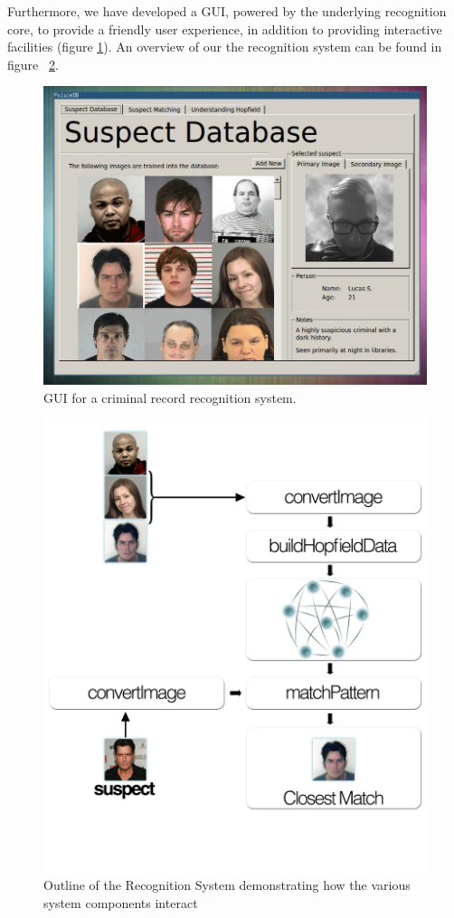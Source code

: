 Furthermore, we have developed a GUI, powered by the underlying recognition core, to provide a friendly user experience, in addition to providing interactive facilities (figure \ref{fig:gui}). An overview of our the recognition system can be found in figure ~\ref{fig:system}.

\begin{figure}[h]
  \centering
\includegraphics[scale=0.3]{screenshots-small/gui1.jpg}
\caption{GUI for a criminal record recognition system.}
\label{fig:gui}
\end{figure}

\begin{figure}[h]
  \centering
\includegraphics[scale=0.3]{recognition.jpg}
\caption{Outline of the Recognition System demonstrating how the various system components interact}
\label{fig:system}
\end{figure}


